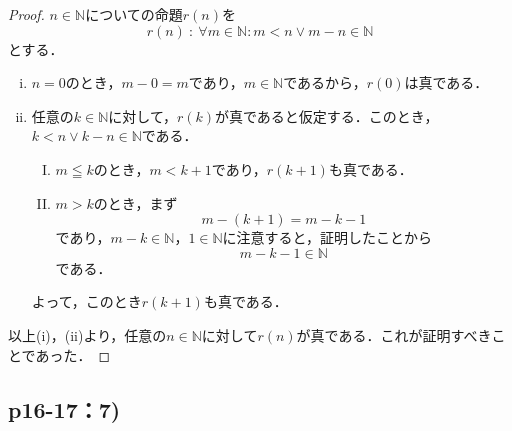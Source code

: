 \documentclass[uplatex,dvipdfmx,a4paper,10pt,fleqn]{jsarticle}
\begin{document}
\begin{tleftbar}
    \begin{proof}
    $n \in \mathbb{N}$についての命題$r(n)$を
    \[
        r(n) ~{:}~ \forall m \in \mathbb{N} \colon  m<n \lor m-n  \in \mathbb{N}
    \]
    とする．
    \begin{enumerate}[(i)]
        \item $n=0$のとき，$m - 0 =m$であり，$m \in \mathbb{N}$であるから，$r(0)$は真である．
        \item 任意の$k \in \mathbb{N}$に対して，$r(k)$が真であると仮定する．このとき，$k<n \lor k-n  \in \mathbb{N}$である．
        \begin{enumerate}[(I)]
        \item $m \leqq   k$のとき，$m <k+1$であり，$r(k+1)$も真である．
        \item $m > k$のとき，まず
        \[
        m-(k+1)=m-k-1 
        \] であり，$m-k \in \mathbb{N}$，$1 \in \mathbb{N}$に注意すると，証明したことから
        \[
        m-k-1  \in \mathbb{N}
        \]
        である．
        \end{enumerate}
        よって，このとき$r(k+1)$も真である．
    \end{enumerate}
    以上(i)，(ii)より，任意の$n \in \mathbb{N}$に対して$r(n)$が真である．これが証明すべきことであった．
\end{proof}
\end{tleftbar}

\newpage 

\subsection*{p16-17：7)}
\end{document}
